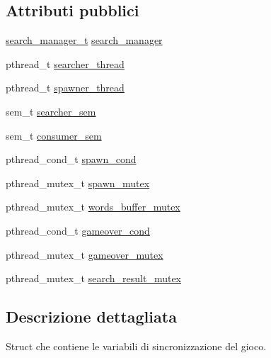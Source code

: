 \subsection*{Attributi pubblici}
\begin{DoxyCompactItemize}
\item 
\hyperlink{structsearch__manager__t}{search\+\_\+manager\+\_\+t} \hyperlink{structthread__manager__t_a1020a46c9471ad522d62cd82f212967d}{search\+\_\+manager}
\item 
pthread\+\_\+t \hyperlink{structthread__manager__t_a0d5c8b3e690252132fcf05abf7b03bca}{searcher\+\_\+thread}
\item 
pthread\+\_\+t \hyperlink{structthread__manager__t_afe6523e46806390d78b6e33c8298b50c}{spawner\+\_\+thread}
\item 
sem\+\_\+t \hyperlink{structthread__manager__t_ae21d407363c3091b08d020ee91d2fb19}{searcher\+\_\+sem}
\item 
sem\+\_\+t \hyperlink{structthread__manager__t_add09eb9696fcde21f6ea575747dd9bc6}{consumer\+\_\+sem}
\item 
pthread\+\_\+cond\+\_\+t \hyperlink{structthread__manager__t_a3d2875e19825c1177a202dbee945dda7}{spawn\+\_\+cond}
\item 
pthread\+\_\+mutex\+\_\+t \hyperlink{structthread__manager__t_a0c6481fe0c14e7061e39e7c71a080a72}{spawn\+\_\+mutex}
\item 
pthread\+\_\+mutex\+\_\+t \hyperlink{structthread__manager__t_acbf655b8885eb6344c889df3bdc04914}{words\+\_\+buffer\+\_\+mutex}
\item 
pthread\+\_\+cond\+\_\+t \hyperlink{structthread__manager__t_adc9c0bc7d1a31425ee832c85e2568a4c}{gameover\+\_\+cond}
\item 
pthread\+\_\+mutex\+\_\+t \hyperlink{structthread__manager__t_af7c55eacef734d190ef5c8ca4bd0a047}{gameover\+\_\+mutex}
\item 
pthread\+\_\+mutex\+\_\+t \hyperlink{structthread__manager__t_ab2460282f6fd131b9d3f0aacb9ddbf72}{search\+\_\+result\+\_\+mutex}
\end{DoxyCompactItemize}


\subsection{Descrizione dettagliata}
Struct che contiene le variabili di sincronizzazione del gioco. 

